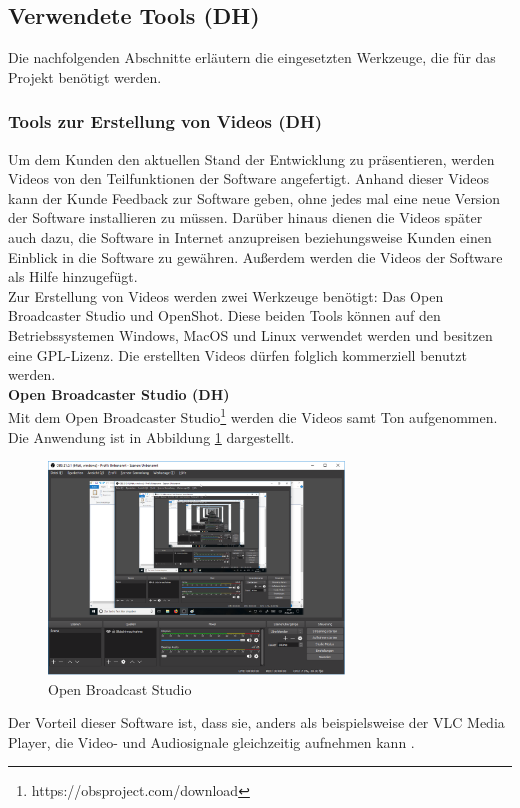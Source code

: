 \subsection{Verwendete Tools (DH)}
Die nachfolgenden Abschnitte erläutern die eingesetzten Werkzeuge, die für das Projekt benötigt werden.

\subsubsection{Tools zur Erstellung von Videos (DH)}
Um dem Kunden den aktuellen Stand der Entwicklung zu präsentieren, werden Videos von den Teilfunktionen der Software angefertigt. Anhand dieser Videos kann der Kunde Feedback zur Software geben, ohne jedes mal eine neue Version der Software installieren zu müssen. Darüber hinaus dienen die Videos später auch dazu, die Software in Internet anzupreisen beziehungsweise Kunden einen Einblick in die Software zu gewähren. Außerdem werden die Videos der Software als Hilfe hinzugefügt.\\
Zur Erstellung von Videos werden zwei Werkzeuge benötigt: Das Open Broadcaster Studio und OpenShot. Diese beiden Tools können auf den Betriebssystemen Windows, MacOS und Linux verwendet werden und besitzen eine GPL-Lizenz. Die erstellten Videos dürfen folglich kommerziell benutzt werden.\bigskip \\
\textbf{Open Broadcaster Studio (DH)}\\
Mit dem Open Broadcaster Studio\footnote{https://obsproject.com/download} werden die Videos samt Ton aufgenommen. Die Anwendung ist in Abbildung \ref{fig:OBS} dargestellt.
\begin{figure}[htb]
	\centering
		\includegraphics[width=0.70\textwidth]{figures/OBS.png}
	\caption{Open Broadcast Studio}
	\label{fig:OBS}
\end{figure}
Der Vorteil dieser Software ist, dass sie, anders als beispielsweise der VLC Media Player, die Video- und Audiosignale gleichzeitig aufnehmen kann \cite[vgl.][]{OBS}.\\
